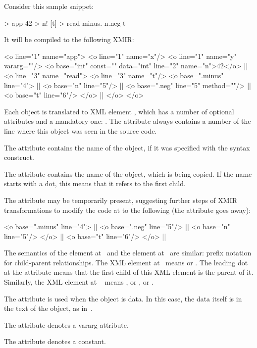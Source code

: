 Consider this sample \eolang{} snippet:

\begin{ffcode}
[x y...] > app
  42 > n!
  [t] > read
    minus.
      n.neg
      t
\end{ffcode}

It will be compiled to the following XMIR:

\begin{ffcode}
<o line="1" name="app">
  <o line="1" name="x"/>
  <o line="1" name="y" vararg=""/>
  <o base="int" const="" data="int"
    line="2" name="n">42</o>   |\(\label{ln:xml-data}\)|
  <o line="3" name="read">
    <o line="3" name="t"/>
    <o base=".minus" line="4"> |\(\label{ln:xml-minus}\)|
      <o base="n" line="5"/> |\(\label{ln:method-start}\)|
      <o base=".neg" line="5" method=""/>  |\(\label{ln:method-end}\)|
      <o base="t" line="6"/>
    </o> |\(\label{ln:xml-minus-end}\)|
  </o>
</o>
\end{ffcode}

Each object is translated to XML element , which has
a number of optional attributes and a mandatory one: .
The attribute  always contains a number of the
line where this object was seen in the source code.

The attribute  contains the name of the object, if
it was specified with the \ff{>} syntax construct.

The attribute  contains the name of the object, which
is being copied. If the name starts with a dot, this means
that it refers to the first  child.

The attribute  may be temporarily present, suggesting
further steps of XMIR transformations to modify the code
at  to the following (the attribute 
goes away):

\begin{ffcode}
<o base=".minus" line="4"> |\(\label{ln:new-minus}\)|
  <o base=".neg" line="5"/> |\(\label{ln:xml-neg}\)|
    <o base="n" line="5"/>
  </o> |\(\label{ln:xml-neg-end}\)|
  <o base="t" line="6"/>
</o> |\(\label{ln:new-minus-end}\)|
\end{ffcode}

The semantics of the element  at~
and the element  at~ are similar: prefix
notation for child-parent relationships. The XML element at~
means  or . The
leading dot at the attribute  means that the first
child of this XML element is the \eolang{} parent of it.
Similarly, the XML element at ~
means , or , or .

The attribute  is used when the object is data. In this
case, the data itself is in the text of the object, as in~.

The attribute  denotes a vararg attribute.

The attribute  denotes a constant.
